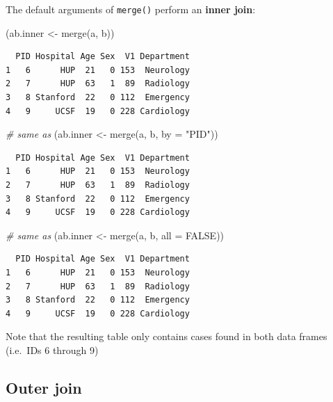 \documentclass[
]{book}
\newenvironment{Shaded}{\begin{snugshade}}{\end{snugshade}}
\newcommand{\AttributeTok}[1]{\textcolor[rgb]{0.77,0.63,0.00}{#1}}
\newcommand{\CommentTok}[1]{\textcolor[rgb]{0.56,0.35,0.01}{\textit{#1}}}
\newcommand{\ConstantTok}[1]{\textcolor[rgb]{0.00,0.00,0.00}{#1}}
\newcommand{\FunctionTok}[1]{\textcolor[rgb]{0.00,0.00,0.00}{#1}}
\newcommand{\NormalTok}[1]{#1}
\newcommand{\OtherTok}[1]{\textcolor[rgb]{0.56,0.35,0.01}{#1}}
\newcommand{\StringTok}[1]{\textcolor[rgb]{0.31,0.60,0.02}{#1}}
\begin{document}
The default arguments of \texttt{merge()} perform an \textbf{inner join}:

\begin{Shaded}
\begin{Highlighting}[]
\NormalTok{(ab.inner }\OtherTok{\textless{}{-}} \FunctionTok{merge}\NormalTok{(a, b))}
\end{Highlighting}
\end{Shaded}

\begin{verbatim}
  PID Hospital Age Sex  V1 Department
1   6      HUP  21   0 153  Neurology
2   7      HUP  63   1  89  Radiology
3   8 Stanford  22   0 112  Emergency
4   9     UCSF  19   0 228 Cardiology
\end{verbatim}

\begin{Shaded}
\begin{Highlighting}[]
\CommentTok{\# same as}
\NormalTok{(ab.inner }\OtherTok{\textless{}{-}} \FunctionTok{merge}\NormalTok{(a, b, }\AttributeTok{by =} \StringTok{"PID"}\NormalTok{))}
\end{Highlighting}
\end{Shaded}

\begin{verbatim}
  PID Hospital Age Sex  V1 Department
1   6      HUP  21   0 153  Neurology
2   7      HUP  63   1  89  Radiology
3   8 Stanford  22   0 112  Emergency
4   9     UCSF  19   0 228 Cardiology
\end{verbatim}

\begin{Shaded}
\begin{Highlighting}[]
\CommentTok{\# same as}
\NormalTok{(ab.inner }\OtherTok{\textless{}{-}} \FunctionTok{merge}\NormalTok{(a, b, }\AttributeTok{all =} \ConstantTok{FALSE}\NormalTok{))}
\end{Highlighting}
\end{Shaded}

\begin{verbatim}
  PID Hospital Age Sex  V1 Department
1   6      HUP  21   0 153  Neurology
2   7      HUP  63   1  89  Radiology
3   8 Stanford  22   0 112  Emergency
4   9     UCSF  19   0 228 Cardiology
\end{verbatim}

Note that the resulting table only contains cases found in both data frames (i.e.~IDs 6 through 9)

\hypertarget{outer-join}{%
\subsection{Outer join}\label{outer-join}}
\end{document}
